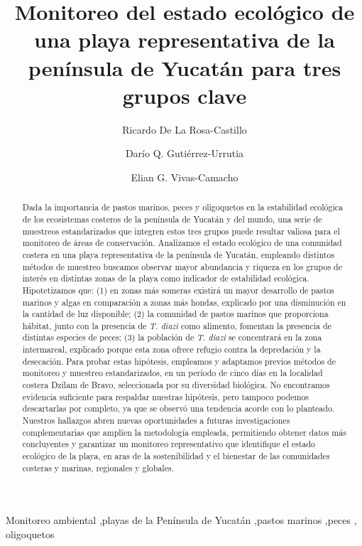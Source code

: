 \documentclass[
  authoryear,
  preprint,
  3p,
  twocolumn]{elsarticle}
\begin{document}
\begin{frontmatter}
\title{Monitoreo del estado ecológico de una playa representativa de la
península de Yucatán para tres grupos clave}
\author[]{Ricardo De La Rosa-Castillo%
%
}
\author[]{Darío Q. Gutiérrez-Urrutia%
%
}
\author[]{Elian G. Vivas-Camacho%
%
}





        
\begin{abstract}
Dada la importancia de pastos marinos, peces y oligoquetos en la
estabilidad ecológica de los ecosistemas costeros de la península de
Yucatán y del mundo, una serie de muestreos estandarizados que integren
estos tres grupos puede resultar valiosa para el monitoreo de áreas de
conservación. Analizamos el estado ecológico de una comunidad costera en
una playa representativa de la península de Yucatán, empleando distintos
métodos de muestreo buscamos observar mayor abundancia y riqueza en los
grupos de interés en distintas zonas de la playa como indicador de
estabilidad ecológica. Hipotetizamos que: (1) en zonas más someras
existirá un mayor desarrollo de pastos marinos y algas en comparación a
zonas más hondas, explicado por una disminución en la cantidad de luz
disponible; (2) la comunidad de pastos marinos que proporciona hábitat,
junto con la presencia de \emph{T. diazi} como alimento, fomentan la
presencia de distintas especies de peces; (3) la población de \emph{T.
diazi} se concentrará en la zona intermareal, explicado porque esta zona
ofrece refugio contra la depredación y la desecación. Para probar estas
hipótesis, empleamos y adaptamos previos métodos de monitoreo y muestreo
estandarizados, en un período de cinco días en la localidad costera
Dzilam de Bravo, seleccionada por su diversidad biológica. No
encontramos evidencia suficiente para respaldar nuestras hipótesis, pero
tampoco podemos descartarlas por completo, ya que se observó una
tendencia acorde con lo planteado. Nuestros hallazgos abren nuevas
oportunidades a futuras investigaciones complementarias que amplíen la
metodología empleada, permitiendo obtener datos más concluyentes y
garantizar un monitoreo representativo que identifique el estado
ecológico de la playa, en aras de la sostenibilidad y el bienestar de
las comunidades costeras y marinas, regionales y globales.
\end{abstract}





\begin{keyword}
    Monitoreo ambiental \sep playas de la Península de
Yucatán \sep pastos marinos \sep peces \sep 
    oligoquetos
\end{keyword}
\end{frontmatter}
    
\end{document}
